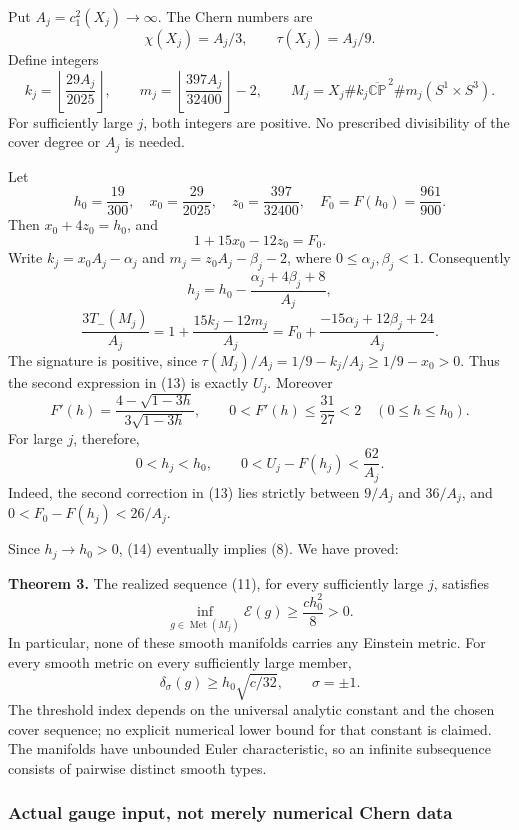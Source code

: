 \documentclass[
  10pt,
]{article}
\begin{document}
Put \(A_j=c_1^2(X_j)\to\infty\). The Chern numbers are \[
 \chi(X_j)=A_j/3,\qquad \tau(X_j)=A_j/9.
\] Define integers \[
 k_j=\left\lfloor\frac{29 A_j}{2025}\right\rfloor,
 \qquad
 m_j=\left\lfloor\frac{397 A_j}{32400}\right\rfloor-2,
 \qquad
 M_j=X_j\#k_j\overline{\mathbb{CP}}^{\,2}
          \#m_j(S^1\times S^3).
 \tag{11}
\] For sufficiently large \(j\), both integers are positive. No
prescribed divisibility of the cover degree or \(A_j\) is needed.

Let \[
 h_0=\frac{19}{300},\quad x_0=\frac{29}{2025},\quad
 z_0=\frac{397}{32400},\quad F_0=F(h_0)=\frac{961}{900}.
\] Then \(x_0+4z_0=h_0\), and \[
 1+15x_0-12z_0=F_0.
 \tag{12}
\] Write \(k_j=x_0A_j-\alpha_j\) and \(m_j=z_0A_j-\beta_j-2\), where
\(0\le\alpha_j,\beta_j<1\). Consequently \[
 h_j=h_0-\frac{\alpha_j+4\beta_j+8}{A_j},
\] \[
 \frac{3T_-(M_j)}{A_j}
 =1+\frac{15k_j-12m_j}{A_j}
 =F_0+\frac{-15\alpha_j+12\beta_j+24}{A_j}.
 \tag{13}
\] The signature is positive, since
\(\tau(M_j)/A_j=1/9-k_j/A_j\ge1/9-x_0>0\). Thus the second expression in
(13) is exactly \(U_j\). Moreover \[
 F'(h)=\frac{4-\sqrt{1-3h}}{3\sqrt{1-3h}},
 \qquad 0<F'(h)\le\frac{31}{27}<2
 \quad(0\le h\le h_0).
\] For large \(j\), therefore, \[
 0<h_j<h_0,\qquad
 \boxed{0<U_j-F(h_j)<\frac{62}{A_j}.}
 \tag{14}
\] Indeed, the second correction in (13) lies strictly between \(9/A_j\)
and \(36/A_j\), and \(0<F_0-F(h_j)<26/A_j\).

Since \(h_j\to h_0>0\), (14) eventually implies (8). We have proved:

\textbf{Theorem 3.} The realized sequence (11), for every sufficiently
large \(j\), satisfies \[
 \boxed{\inf_{g\in\operatorname{Met}(M_j)}\mathcal E(g)
       \ge\frac{c h_0^2}{8}>0.}
 \tag{15}
\] In particular, none of these smooth manifolds carries any Einstein
metric. For every smooth metric on every sufficiently large member, \[
 \delta_\sigma(g)\ge h_0\sqrt{c/32},\qquad \sigma=\pm1.
 \tag{16}
\] The threshold index depends on the universal analytic constant and
the chosen cover sequence; no explicit numerical lower bound for that
constant is claimed. The manifolds have unbounded Euler characteristic,
so an infinite subsequence consists of pairwise distinct smooth types.

\hypertarget{actual-gauge-input-not-merely-numerical-chern-data}{%
\subsubsection{Actual gauge input, not merely numerical Chern
data}\label{actual-gauge-input-not-merely-numerical-chern-data}}
\end{document}
